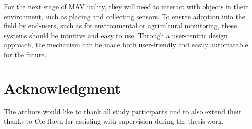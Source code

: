 For the next stage of \gls{MAV} utility, they will need to interact with objects in their environment, such as placing and collecting sensors. To ensure adoption into the field by end-users, such as for environmental or agricultural monitoring, these systems should be intuitive and easy to use. Through a user-centric design approach, the mechanism can be made both user-friendly and easily automatable for the future.







\section*{Acknowledgment}

The authors would like to thank all study participants and to also extend their thanks to Ole Ravn for assisting with supervision during the thesis work.


% 
% 

% 
